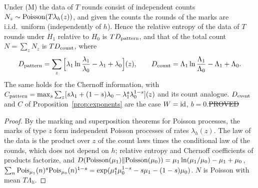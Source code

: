 \begin{lemma}\label{lem:poisson-kl}
Under (M) the data of $T$ rounds consist of independent counts $N_z\sim{\rm Poisson}(T\lambda_h(z))$, and given the counts the rounds of the marks are i.i.d.\ uniform (independently of $h$). Hence the relative entropy of the data of $T$ rounds under $H_1$ relative to $H_0$ is $T D_{\rm pattern}$, and that of the total count $N=\sum_zN_z$ is $TD_{\rm count}$, where
\[
D_{\rm pattern}=\sum_z\Big[\lambda_1\ln\frac{\lambda_1}{\lambda_0}-\lambda_1+\lambda_0\Big](z),\qquad D_{\rm count}=\Lambda_1\ln\frac{\Lambda_1}{\Lambda_0}-\Lambda_1+\Lambda_0 .
\]
The same holds for the Chernoff information, with $C_{\rm pattern}=\max_s\sum_z[s\lambda_1+(1-s)\lambda_0-\lambda_1^s\lambda_0^{1-s}](z)$ and its count analogue. $D_{\rm event}$ and $C$ of Proposition~\ref{prop:exponents} are the case $W={\rm id}$, $b=0$.\hfill\st{PROVED}
\end{lemma}
\begin{proof}
By the marking and superposition theorems for Poisson processes, the marks of type $z$ form independent Poisson processes of rates $\lambda_h(z)$. The law of the data is the product over $z$ of the count laws times the conditional law of the rounds, which does not depend on $h$; relative entropy and Chernoff coefficients of products factorize, and $D({\rm Poisson}(\mu_1)\|{\rm Poisson}(\mu_0))=\mu_1\ln(\mu_1/\mu_0)-\mu_1+\mu_0$, $\sum_n{\rm Pois}_{\mu_1}(n)^s{\rm Pois}_{\mu_0}(n)^{1-s}=\exp(\mu_1^s\mu_0^{1-s}-s\mu_1-(1-s)\mu_0)$. $N$ is Poisson with mean $T\Lambda_h$.
\end{proof}

